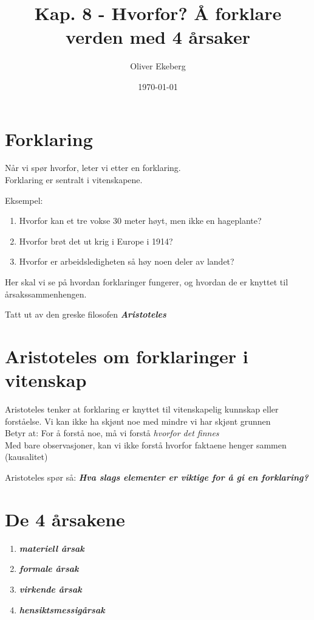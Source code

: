 \documentclass[11pt, a4paper]{article}
\title{Kap. 8 - Hvorfor? Å forklare verden med 4 årsaker}
\author{Oliver Ekeberg}
\date{\today}
\begin{document}
\maketitle

\tableofcontents

\section{Forklaring}

Når vi spør hvorfor, leter vi etter en forklaring.\\

Forklaring er sentralt i vitenskapene.

Eksempel:

\begin{enumerate}
    \item Hvorfor kan et tre vokse 30 meter høyt, men ikke en hageplante?
    \item Hvorfor brøt det ut krig i Europe i 1914?
    \item Hvorfor er arbeidsledigheten så høy noen deler av landet?
\end{enumerate}


Her skal vi se på hvordan forklaringer fungerer, og hvordan de er knyttet til årsakssammenhengen.

Tatt ut av den greske filosofen \textbf{\textit{Aristoteles}}


\section{Aristoteles om forklaringer i vitenskap}


Aristoteles tenker at forklaring er knyttet til vitenskapelig kunnskap eller forståelse. Vi kan ikke ha skjønt noe med mindre vi har skjønt grunnen\\

Betyr at: For å forstå noe, må vi forstå \textit{hvorfor det finnes}\\

Med bare observasjoner, kan vi ikke forstå hvorfor faktaene henger sammen (kausalitet)


Aristoteles spør så: \textbf{\textit{Hva slags elementer er viktige for å gi en forklaring?}}

\section{De 4 årsakene}


\begin{enumerate}
    \item \textbf{\textit{materiell årsak}}
    \item \textbf{\textit{formale årsak}}
    \item \textbf{\textit{virkende årsak}}
    \item \textbf{\textit{hensiktsmessigårsak}}
\end{enumerate}
\end{document}
